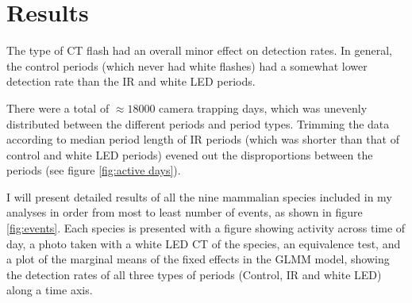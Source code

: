 \chapter{Results}


The type of CT flash had an overall minor effect on detection rates.
In general, the control periods (which never had white flashes) had a somewhat lower detection rate than the IR and white LED periods.

There were a total of $\approx 18 000$ camera trapping days, which was unevenly distributed between the different periods and period types. Trimming the data according to median period length of IR periods (which was shorter than that of control and white LED periods) evened out the disproportions between the periods (see figure \ref{fig:active days}).



I will present detailed results of all the nine mammalian species included in my analyses in order from most to least number of events, as shown in figure \ref{fig:events}.
Each species is presented with a figure showing activity across time of day, a photo taken with a white LED CT of the species, %
an equivalence test, and a plot of the marginal means of the fixed effects in the GLMM model, showing the detection rates of all three types of periods (Control, IR and white LED) along a time axis.

